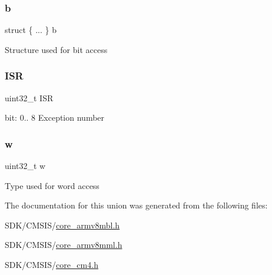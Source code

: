 \subsubsection{\texorpdfstring{b}{b}\hspace{0.1cm}{\footnotesize\ttfamily [3/3]}}
{\footnotesize\ttfamily struct \{ ... \}   b}

Structure used for bit access \mbox{\label{union_i_p_s_r___type_ad502ba7dbb2aab5f87c782b28f02622d}} 
\subsubsection{\texorpdfstring{I\+SR}{ISR}}
{\footnotesize\ttfamily uint32\+\_\+t I\+SR}

bit\+: 0.. 8 Exception number \mbox{\label{union_i_p_s_r___type_ad0fb62e7a08e70fc5e0a76b67809f84b}} 
\subsubsection{\texorpdfstring{w}{w}}
{\footnotesize\ttfamily uint32\+\_\+t w}

Type used for word access 

The documentation for this union was generated from the following files\+:\begin{DoxyCompactItemize}
\item 
S\+D\+K/\+C\+M\+S\+I\+S/\mbox{\hyperlink{core__armv8mbl_8h}{core\+\_\+armv8mbl.\+h}}\item 
S\+D\+K/\+C\+M\+S\+I\+S/\mbox{\hyperlink{core__armv8mml_8h}{core\+\_\+armv8mml.\+h}}\item 
S\+D\+K/\+C\+M\+S\+I\+S/\mbox{\hyperlink{core__cm4_8h}{core\+\_\+cm4.\+h}}\end{DoxyCompactItemize}
